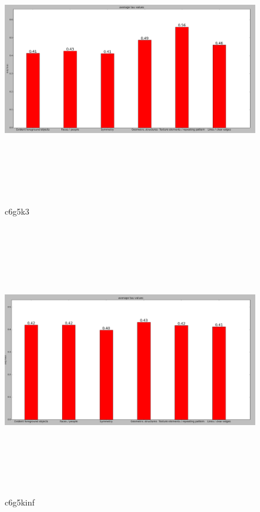 		
		
		\begin{figure}[h] \label{c6g5k3}
			\includegraphics[width=\linewidth,height=12cm,keepaspectratio]{Figures/c6g5k3}
			\caption[c6g5k3]
			{c6g5k3}
		\end{figure}
		
		\begin{figure}[h] \label{c6g5kinf}
			\includegraphics[width=\linewidth,height=12cm,keepaspectratio]{Figures/c6g5kinf}
			\caption[c6g5kinf]
			{c6g5kinf}
		\end{figure}
		
